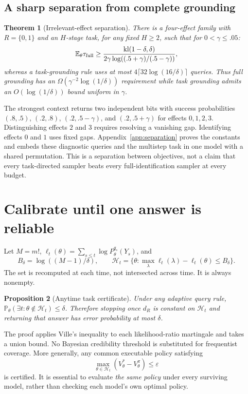 \documentclass{article}
\newtheorem{theorem}{Theorem}
\newtheorem{proposition}[theorem]{Proposition}
\newcommand{\kl}{\operatorname{kl}}
\newcommand{\E}{\mathbb E}
\newcommand{\Prob}{\mathbb P}
\begin{document}
\subsection{A sharp separation from complete grounding}
\begin{theorem}[Irrelevant-effect separation]\label{thm:separation}
There is a four-effect family with $R=\{0,1\}$ and an $H$-stage task, for any fixed $H\ge2$, such that for $0<\gamma\le .05$:
\begin{equation}
\E_\theta\tau_{\rm full}\ge
\frac{\kl(1-\delta,\delta)}{2\gamma\log((.5+\gamma)/(.5-\gamma))}, \label{eq:sepfull}
\end{equation}
whereas a task-grounding rule uses at most
$4\lceil32\log(16/\delta)\rceil$ queries. Thus full grounding has an $\Omega(\gamma^{-2}\log(1/\delta))$ requirement while task grounding admits an $O(\log(1/\delta))$ bound uniform in $\gamma$.
\end{theorem}
The strongest context returns two independent bits with success probabilities $(.8,.5)$, $(.2,.8)$, $(.2,.5-\gamma)$, and $(.2,.5+\gamma)$ for effects $0,1,2,3$. Distinguishing effects $2$ and $3$ requires resolving a vanishing gap. Identifying effects $0$ and $1$ uses fixed gaps. Appendix~\ref{app:separation} proves the constants and embeds these diagnostic queries and the multistep task in one model with a shared permutation. This is a separation between objectives, not a claim that every task-directed sampler beats every full-identification sampler at every budget.

\section{Calibrate until one answer is reliable}
Let $M=m!$, $\ell_t(\theta)=\sum_{s\le t}\log P_\theta^{q_s}(Y_s)$, and
\begin{equation}
B_\delta=\log((M-1)/\delta),\qquad
\mathcal H_t=\{\theta:\max_\lambda\ell_t(\lambda)-\ell_t(\theta)\le B_\delta\}. \label{eq:confidence}
\end{equation}
The set is recomputed at each time, not intersected across time. It is always nonempty.
\begin{proposition}[Anytime task certificate]\label{prop:certificate}
Under any adaptive query rule, $\Prob_\theta(\exists t:\theta\notin\mathcal H_t)\le\delta$. Therefore stopping once $d_R$ is constant on $\mathcal H_t$ and returning that answer has error probability at most $\delta$.
\end{proposition}
The proof applies Ville's inequality to each likelihood-ratio martingale and takes a union bound. No Bayesian credibility threshold is substituted for frequentist coverage. More generally, any common executable policy satisfying
\begin{equation}
\max_{\theta\in\mathcal H_t}(V_\theta^*-V_\theta^\pi)\le\varepsilon \label{eq:policy}
\end{equation}
is certified. It is essential to evaluate \emph{the same policy} under every surviving model, rather than checking each model's own optimal policy.
\end{document}
